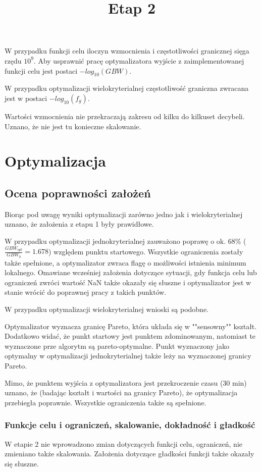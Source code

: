 \documentclass{article}
\begin{document}
W przypadku funkcji celu iloczyn wzmocnienia i częstotliwości granicznej sięga rzędu $10^9$.
Aby usprawnić pracę optymalizatora wyjście z zaimplementowanej funkcji celu jest postaci $-log_{10}(GBW)$.

W przypadku optymalizacji wielokryterialnej częstotliwość graniczna zwracana jest w postaci $-log_{10}(f_g)$.

Wartości wzmocnienia nie przekraczają zakresu od kilku do kilkuset decybeli. Uznano, że nie jest tu konieczne skalowanie. 

\pagebreak
\begin{center}
    \title{ \huge \textbf{Etap 2}}

\end{center}

\section{Optymalizacja}
\subsection{Ocena poprawności założeń}
Biorąc pod uwagę wyniki optymalizacji zarówno jedno jak i wielokryterialnej uznano, że założenia z etapu 1 były prawidłowe.

W przypadku optymalizacji jednokryterialnej zauważono poprawę o ok. 68\% ($\frac{GBW_{opt}}{GBW_{0}}=1.678$) względem punktu startowego. Wszystkie ograniczenia zostały także spełnione, a optymalizator
zwraca flagę o możliwości istnienia minimum lokalnego. Omawiane wcześniej założenia dotyczące sytuacji, gdy funkcja celu lub ograniczeń zwróci wartość NaN także okazały się słuszne i optymalizator jest w stanie wrócić do poprawnej pracy z takich punktów.

W przypadku optymalizacji wielokryterialnej wnioski są podobne.

Optymalizator wyznacza granicę Pareto, która układa się w ""sensowny"" kształt. Dodatkowo widać, że punkt startowy jest punktem zdominowanym, natomiast te wyznaczone prze algorytm są pareto-optymalne.
Punkt wyznaczony jako optymalny w optymalizacji jednokryterialnej także leży na wyznaczonej granicy Pareto.

Mimo, że punktem wyjścia z optymalizatora jest przekroczenie czasu (30 min) uznano, że (badając kształt i wartości na granicy Pareto),
że optymalizacja przebiegła poprawnie. Wszystkie ograniczenia także są spełnione.

\subsubsection{Funkcje celu i ograniczeń, skalowanie, dokładność i gładkość}
W etapie 2 nie wprowadzono zmian dotyczących funkcji celu, ograniczeń, nie zmieniano także skalowania.
Założenia dotyczące gładkości funkcji także okazały się słuszne.
\end{document}
